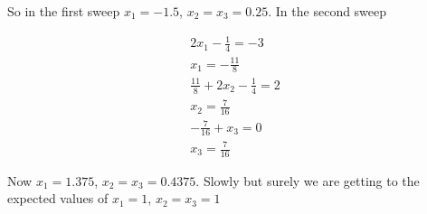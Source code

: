 \documentclass[a4paper,12pt]{article}
\begin{document}
So in the first sweep $x_1=-1.5$, $x_2=x_3=0.25$. In the second sweep

\begin{eqnarray*}
2x_1-\frac{1}{4}=-3 \\
x_1=-\frac{11}{8} \\
\frac{11}{8}+2x_2-\frac{1}{4}=2 \\
x_2=\frac{7}{16} \\
-\frac{7}{16}+x_3=0 \\
x_3=\frac{7}{16}
\end{eqnarray*}

Now $x_1=1.375$, $x_2=x_3=0.4375$. Slowly but surely we are getting to the expected values of $x_1=1$, $x_2=x_3=1$
\end{document}
